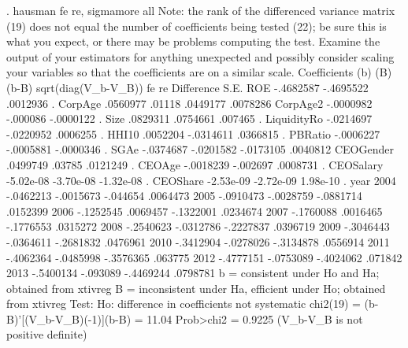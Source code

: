 . hausman fe re, sigmamore all
{\smallskip}
Note: the rank of the differenced variance matrix (19) does not equal the number of coefficients being tested (22); be sure this is what you expect, or there may be
        problems computing the test.  Examine the output of your estimators for anything unexpected and possibly consider scaling your variables so that the
        coefficients are on a similar scale.
{\smallskip}
                  Coefficients 
             {\VBAR}      (b)          (B)            (b-B)     sqrt(diag(V_b-V_B))
             {\VBAR}       fe           re         Difference          S.E.
         ROE {\VBAR}   -.4682587    -.4695522        .0012936               .
     CorpAge {\VBAR}    .0560977       .01118        .0449177        .0078286
    CorpAge2 {\VBAR}   -.0000982     -.000086       -.0000122               .
        Size {\VBAR}    .0829311     .0754661         .007465               .
LiquidityR{\tytilde}o {\VBAR}   -.0214697    -.0220952        .0006255               .
       HHI10 {\VBAR}    .0052204    -.0314611        .0366815               .
     PBRatio {\VBAR}   -.0006227    -.0005881       -.0000346               .
        SGAe {\VBAR}   -.0374687    -.0201582       -.0173105        .0040812
   CEOGender {\VBAR}    .0499749       .03785        .0121249               .
      CEOAge {\VBAR}   -.0018239     -.002697        .0008731               .
   CEOSalary {\VBAR}   -5.02e-08    -3.70e-08       -1.32e-08               .
    CEOShare {\VBAR}   -2.53e-09    -2.72e-09        1.98e-10               .
        year {\VBAR}
       2004  {\VBAR}   -.0462213    -.0015673        -.044654        .0064473
       2005  {\VBAR}   -.0910473    -.0028759       -.0881714        .0152399
       2006  {\VBAR}   -.1252545     .0069457       -.1322001        .0234674
       2007  {\VBAR}   -.1760088     .0016465       -.1776553        .0315272
       2008  {\VBAR}   -.2540623    -.0312786       -.2227837        .0396719
       2009  {\VBAR}   -.3046443    -.0364611       -.2681832        .0476961
       2010  {\VBAR}   -.3412904    -.0278026       -.3134878        .0556914
       2011  {\VBAR}   -.4062364    -.0485998       -.3576365         .063775
       2012  {\VBAR}   -.4777151    -.0753089       -.4024062         .071842
       2013  {\VBAR}   -.5400134     -.093089       -.4469244        .0798781
                         b = consistent under Ho and Ha; obtained from xtivreg
          B = inconsistent under Ha, efficient under Ho; obtained from xtivreg
{\smallskip}
    Test:  Ho:  difference in coefficients not systematic
{\smallskip}
                 chi2(19) = (b-B)'[(V_b-V_B){\caret}(-1)](b-B)
                          =       11.04
                Prob>chi2 =      0.9225
                (V_b-V_B is not positive definite)
